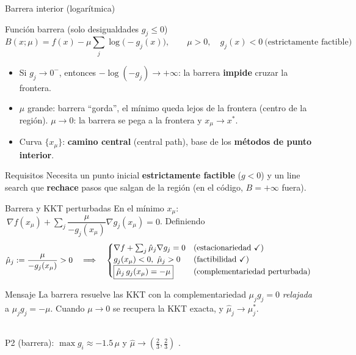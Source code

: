 \documentclass[aspectratio=169]{beamer}
\newcommand{\grad}{\nabla}
\begin{document}
\begin{frame}{Barrera interior (logarítmica)}
  \begin{block}{Función barrera (solo desigualdades $g_j\le0$)}
    \[ B(x;\mu)=f(x)-\mu\sum_j\log\bigl(-g_j(x)\bigr),\qquad \mu>0,\quad g_j(x)<0\ \text{(estrictamente factible)} \]
  \end{block}
  \begin{itemize}
    \item Si $g_j\to0^-$, entonces $-\log(-g_j)\to+\infty$: la barrera \textbf{impide} cruzar la frontera.
    \item $\mu$ grande: barrera ``gorda'', el mínimo queda lejos de la frontera (centro de la región). $\mu\to0$: la barrera se pega a la frontera y $x_\mu\to x^\ast$.
    \item Curva $\{x_\mu\}$: \textbf{camino central} (central path), base de los \textbf{métodos de punto interior}.
  \end{itemize}
  \begin{alertblock}{Requisitos}
    Necesita un punto inicial \textbf{estrictamente factible} ($g<0$) y un line search que \textbf{rechace} pasos que salgan de la región (en el código, $B=+\infty$ fuera).
  \end{alertblock}
\end{frame}

\begin{frame}{Barrera y KKT perturbadas}
  \footnotesize
  En el mínimo $x_\mu$: $\ \grad f(x_\mu)+\sum_j\dfrac{\mu}{-g_j(x_\mu)}\grad g_j(x_\mu)=0$. Definiendo
  \[ \hat\mu_j:=\frac{\mu}{-g_j(x_\mu)}>0\quad\Longrightarrow\quad
     \begin{cases}\grad f+\sum_j\hat\mu_j\grad g_j=0 &\text{(estacionariedad \checkmark{})}\\ g_j(x_\mu)<0,\ \hat\mu_j>0 &\text{(factibilidad \checkmark{})}\\ \boxed{\hat\mu_j\,g_j(x_\mu)=-\mu} &\text{(complementariedad perturbada)}\end{cases} \]
  \begin{alertblock}{Mensaje}
    La barrera resuelve las KKT con la complementariedad $\mu_jg_j=0$ \emph{relajada} a $\mu_jg_j=-\mu$. Cuando $\mu\to0$ se recupera la KKT exacta, y $\hat\mu_j\to\mu_j^\ast$.
  \end{alertblock}
  \begin{center}\tiny
  \resizebox{0.62\linewidth}{!}{}\\[2pt]
  \scriptsize P2 (barrera): $\max g_i\approx-1.5\,\mu$ y $\hat\mu\to(\tfrac23,\tfrac23)$ \checkmark{}.
  \end{center}
\end{frame}
\end{document}
